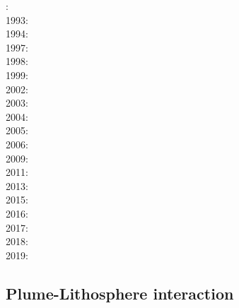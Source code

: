 : \cite{kell91}\\
1993: \cite{keki93}\\
1994: \cite{nasf94}\cite{fari94}\cite{leka94b}\cite{hayu94}\\
1997: \cite{vank97}\cite{keki97}\\
1998: \cite{thta98}\\
1999: \cite{lays99}\\
2002: \cite{falt02}\cite{dagl02}\cite{nitg02}\cite{tagh02}\\
2003: \cite{safa03}\\
2004: \cite{goch04}\cite{scmo04}\\
2005: \cite{tagu05}\\
2006: \cite{isst06}\cite{liva06a}\cite{liva06b}\cite{zhon06}\cite{mita06}\cite{nokm06}\cite{qufo06}
      \cite{keso06}\\
2009: \cite{vavl09}\cite{bogj09}\cite{faho09}\\
2011: \cite{toyu11}\cite{talz11}\cite{burk11}\cite{memm11}\cite{dalt11}\cite{tree11}\\
2013: \cite{dagm13}\cite{madd13}\cite{ande13}\\
2015: \cite{daso15}\cite{hafg15}\\
2016: \cite{kili16}\\
2017: \cite{zhli17}\\
2018: \cite{dacc18}\cite{trev18}\\
2019: \cite{argc19}

\subsection*{Plume-Lithosphere interaction}

